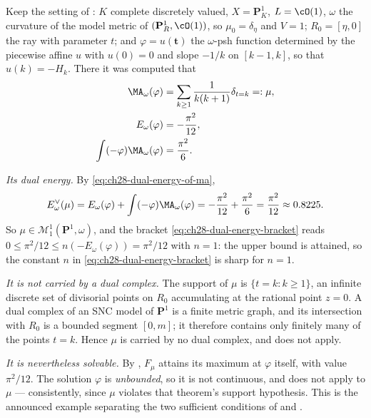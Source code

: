 \begin{example}
\label{ex:ch28-unbounded-dual-energy}
Keep the setting of : \(K\) complete
discretely valued, \(X=\mathbf P^1_K\), \(L=\cO(1)\), \(\omega\) the
curvature of the model metric of \((\mathbf P^1_R,\cO(1))\), so
\(\mu_0=\delta_\eta\) and \(V=1\); \(R_0=[\eta,0]\) the ray with parameter
\(t\); and \(\varphi=u(\mathbf t)\) the \(\omega\)-psh function determined by
the piecewise affine \(u\) with \(u(0)=0\) and slope \(-1/k\) on
\([k-1,k]\), so that \(u(k)=-H_k\).  There it was computed that
\[
 \begin{aligned}
 \MA_\omega(\varphi)
   &=\sum_{k\geq1}\frac1{k(k+1)}\delta_{t=k}=: \mu,\\
 E_\omega(\varphi)&=-\frac{\pi^2}{12},\\
 \int(-\varphi)\MA_\omega(\varphi)&=\frac{\pi^2}6 .
 \end{aligned}
\]

\emph{Its dual energy.}  By \eqref{eq:ch28-dual-energy-of-ma},
\begin{equation}
\label{eq:ch28-unbounded-dual-energy}
 E^\vee_\omega(\mu)
 =E_\omega(\varphi)+\int(-\varphi)\MA_\omega(\varphi)
 =-\frac{\pi^2}{12}+\frac{\pi^2}{6}
 =\frac{\pi^2}{12}\approx0.8225 .
\end{equation}
So \(\mu\in\mathcal M^1_1(\mathbf P^1,\omega)\), and the bracket
\eqref{eq:ch28-dual-energy-bracket} reads
\(0\leq\pi^2/12\leq n(-E_\omega(\varphi))=\pi^2/12\) with \(n=1\): the upper
bound is attained, so the constant \(n\) in
\eqref{eq:ch28-dual-energy-bracket} is sharp for \(n=1\).

\emph{It is not carried by a dual complex.}  The support of \(\mu\) is
\(\{t=k:k\geq1\}\), an infinite discrete set of divisorial points on
\(R_0\) accumulating at the rational point \(z=0\).  A dual complex of an
SNC model of \(\mathbf P^1\) is a finite metric graph, and its intersection
with \(R_0\) is a bounded segment \([0,m]\); it therefore contains only
finitely many of the points \(t=k\).  Hence \(\mu\) is carried by no dual
complex, and  does not apply.

\emph{It is nevertheless solvable.}  By
, \(F_\mu\) attains its maximum at
\(\varphi\) itself, with value \(\pi^2/12\).  The solution \(\varphi\) is
\emph{unbounded}, so it is not continuous, and
 does not apply to \(\mu\) --- consistently, since
\(\mu\) violates that theorem's support hypothesis.  This is the announced
example separating the two sufficient conditions of
 and .


\end{example}
